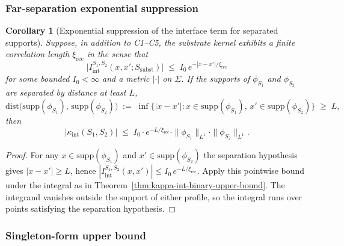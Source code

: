 \documentclass[11pt]{article}
\newtheorem{corollary}[theorem]{Corollary}
\begin{document}
\subsubsection*{Far-separation exponential suppression}

\begin{corollary}[Exponential suppression of the interface term for separated supports]\label{cor:kappa-int-far-separation}
Suppose, in addition to C1--C5, the substrate kernel exhibits a finite correlation length $\xi_{\mathrm{rec}}$ in the sense that
\[
    \bigl|I_{\mathrm{int}}^{S_1, S_2}(x, x'; S_{\mathrm{subst}})\bigr|
    \;\le\;
    I_0 \, e^{-|x - x'|/\xi_{\mathrm{rec}}}
\]
for some bounded $I_0 < \infty$ and a metric $|\cdot|$ on $\Sigma$.  If the supports of $\phi_{S_1}$ and $\phi_{S_2}$ are separated by distance at least $L$,
\[
    \mathrm{dist}\bigl(\mathrm{supp}(\phi_{S_1}),\,\mathrm{supp}(\phi_{S_2})\bigr)
    \;:=\;
    \inf\bigl\{|x - x'| : x\in\mathrm{supp}(\phi_{S_1}),\, x'\in\mathrm{supp}(\phi_{S_2})\bigr\}
    \;\ge\; L,
\]
then
\[
    \bigl|\kappa_{\mathrm{int}}(S_1, S_2)\bigr|
    \;\le\;
    I_0 \cdot e^{-L/\xi_{\mathrm{rec}}} \cdot \|\phi_{S_1}\|_{L^1} \cdot \|\phi_{S_2}\|_{L^1}.
\]
\end{corollary}
\begin{proof}
For any $x \in \mathrm{supp}(\phi_{S_1})$ and $x' \in \mathrm{supp}(\phi_{S_2})$ the separation hypothesis gives $|x - x'| \ge L$, hence $|I_{\mathrm{int}}^{S_1, S_2}(x, x')| \le I_0 \, e^{-L/\xi_{\mathrm{rec}}}$.  Apply this pointwise bound under the integral as in Theorem~\ref{thm:kappa-int-binary-upper-bound}.  The integrand vanishes outside the support of either profile, so the integral runs over points satisfying the separation hypothesis.
\end{proof}

\subsubsection*{Singleton-form upper bound}
\end{document}
